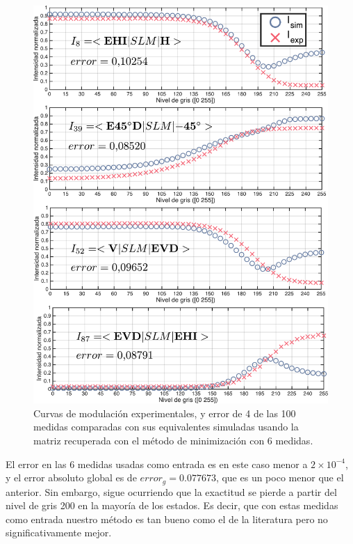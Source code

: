 \begin{figure}[h!]
\centering
\includegraphics[scale=.5]{some_6min_caracterization_results.pdf}
\caption[Curvas de modulación experimentales comparadas con las
simuladas usando el modelo obtenido con el método de minimización de 6
medidas]{Curvas de modulación
  experimentales, y error de 4 de las 100 medidas comparadas con sus
  equivalentes simuladas usando la matriz recuperada con el método de
  minimización con 6 medidas.}
\label{fig:6m_caracterization_results}
\end{figure}
El error en las 6 medidas usadas como entrada es en este caso menor a
$2\times10^{-4}$, y el error absoluto global es de $error_g
=0.077673$, que es un poco menor que el anterior. Sin embargo, sigue ocurriendo que la exactitud se pierde a partir del
nivel de gris 200 en la mayoría de los estados. Es decir, que con estas medidas como entrada
nuestro método es tan bueno como el de la literatura pero no significativamente mejor.
